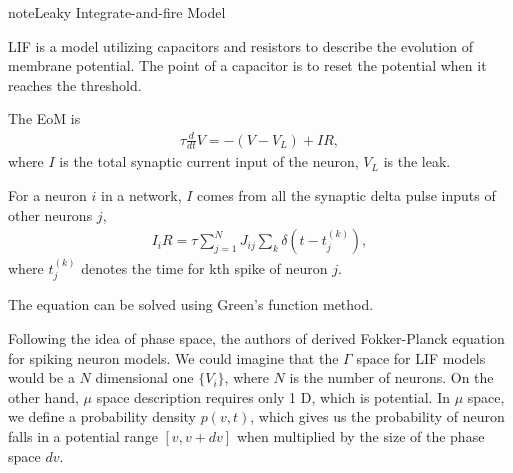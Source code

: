 \documentclass[letterpaper,10pt,english]{sphinxmanual}
\begin{document}
\begin{sphinxadmonition}{note}{Leaky Integrate-and-fire Model}

LIF is a model utilizing capacitors and resistors to describe the evolution of membrane potential. The point of a capacitor is to reset the potential when it reaches the threshold.

The EoM is
\begin{equation*}
\begin{split}\tau \frac{d}{dt} V = - (V - V_L) + IR,\end{split}
\end{equation*}
where \(I\) is the total synaptic current input of the neuron, \(V_L\) is the leak.

For a neuron \(i\) in a network, \(I\) comes from all the synaptic delta pulse inputs of other neurons \(j\),
\begin{equation*}
\begin{split}I_i R = \tau \sum_{j=1}^N J_{ij} \sum_k \delta(t-t_j^{(k)}),\end{split}
\end{equation*}
where \(t_j^{(k)}\) denotes the time for kth spike of neuron \(j\).

The equation can be solved using Green’s function method.
\end{sphinxadmonition}

Following the idea of phase space, the authors of \label{\detokenize{topics/mean-field:id4}}{\hyperref[\detokenize{topics/mean-field:deco2008}]{\sphinxcrossref{{[}Deco2008{]}}}} derived Fokker-Planck equation for spiking neuron models. We could imagine that the \(\Gamma\) space for LIF models would be a \(N\) dimensional one \(\{V_i\}\), where \(N\) is the number of neurons. On the other hand, \(\mu\) space description requires only 1 D, which is potential. In \(\mu\) space, we define a probability density \(p(v,t)\), which gives us the probability of neuron falls in a potential range \([v,v+dv]\) when multiplied by the size of the phase space \(dv\).
\end{document}
